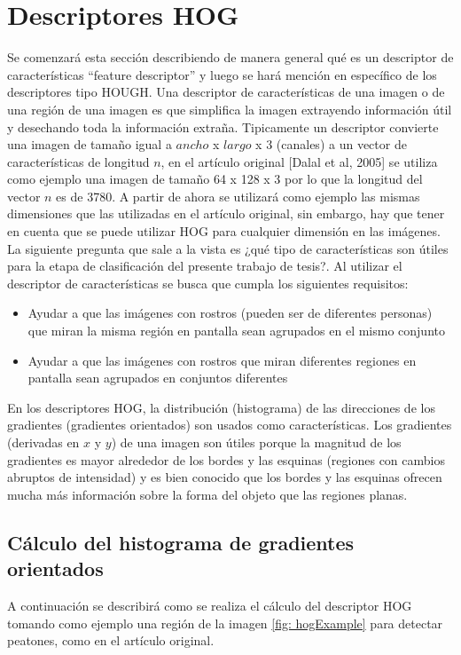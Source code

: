    \section{Descriptores HOG}

   Se comenzará esta sección describiendo de manera general qué es un descriptor de características ``feature descriptor'' y luego se hará mención en específico de los descriptores tipo HOUGH. Una descriptor de características de una imagen o de una región de una imagen es que simplifica la imagen extrayendo información útil y desechando toda la información extraña.
   Tipicamente un descriptor convierte una imagen de tamaño igual a $ancho$ x $largo$ x $3$ (canales) a un vector de características de longitud $n$, en el artículo original [Dalal et al, 2005] se utiliza como ejemplo una imagen de tamaño 64 x 128 x 3 por lo que la longitud del vector $n$ es de 3780. A partir de ahora se utilizará como ejemplo las mismas dimensiones que las utilizadas en el artículo original, sin embargo, hay que tener en cuenta que se puede utilizar HOG para cualquier dimensión en las imágenes.\\
   La siguiente pregunta que sale a la vista es ¿qué tipo de características son útiles para la etapa de clasificación del presente trabajo de tesis?. Al utilizar el descriptor de características se busca que cumpla los siguientes requisitos:
   \begin{itemize}
		\item Ayudar a que las imágenes con rostros (pueden ser de diferentes personas) que miran la misma región en pantalla sean agrupados en el mismo conjunto
		\item Ayudar a que las imágenes con rostros que miran diferentes regiones en pantalla sean agrupados en conjuntos diferentes
   \end{itemize}
En los descriptores HOG, la distribución (histograma) de las direcciones de los gradientes (gradientes orientados) son usados como características. Los gradientes (derivadas en $x$ y $y$) de una imagen son útiles porque la magnitud de los gradientes es mayor alrededor de los bordes y las esquinas (regiones con cambios abruptos de intensidad) y es bien conocido que los bordes y las esquinas ofrecen mucha más información sobre la forma del objeto que las regiones planas.

\subsection{Cálculo del histograma de gradientes orientados}
A continuación se describirá como se realiza el cálculo del descriptor HOG tomando como ejemplo una región de la imagen \ref{fig: hogExample} para detectar peatones, como en el artículo original.

